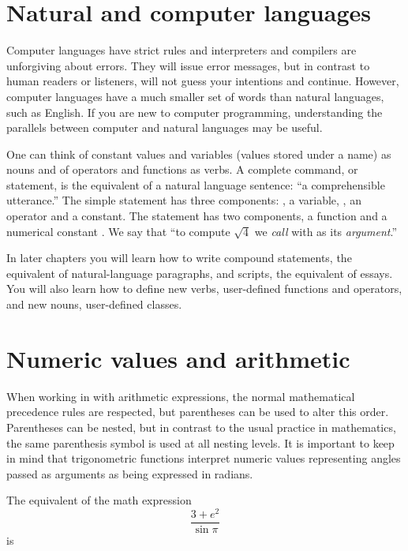 \documentclass[krantz2]{krantz}\usepackage{knitr}
\begin{document}
\section{Natural and computer languages}
Computer languages have strict rules and interpreters and compilers are unforgiving about errors. They will issue error messages, but in contrast to human readers or listeners, will not guess your intentions and continue. However, computer languages have a much smaller set of words than natural languages, such as English. If you are new to computer programming, understanding the parallels between computer and natural languages may be useful.

One can think of constant values and variables (values stored under a name) as nouns and of operators and functions as verbs. A complete command, or statement, is the equivalent of a natural language sentence: ``a comprehensible utterance.'' The simple statement  has three components: , a variable, \code{+}, an operator and  a constant. The statement  has two components, a function  and a numerical constant . We say that ``to compute $\sqrt{4}$ we \emph{call}  with  as its \emph{argument}.''

In later chapters you will learn how to write compound statements, the equivalent of natural-language paragraphs, and scripts, the equivalent of essays. You will also learn how to define new verbs, user-defined functions and operators, and new nouns, user-defined classes.

\section{Numeric values and arithmetic}
\qRoperator{+}\qRoperator{-}\qRoperator{*}\qRoperator{/}
When working in \Rlang with arithmetic expressions, the normal mathematical precedence rules are respected, but parentheses can be used to alter this order. Parentheses can be nested, but in contrast to the usual practice in mathematics, the same parenthesis symbol is used at all nesting levels. It is important to keep in mind that trigonometric \Rlang functions interpret numeric values representing angles passed as arguments as being expressed in radians.

The equivalent of the math expression
$$
\frac{3 + e^2}{\sin \pi}
$$
is
\end{document}
